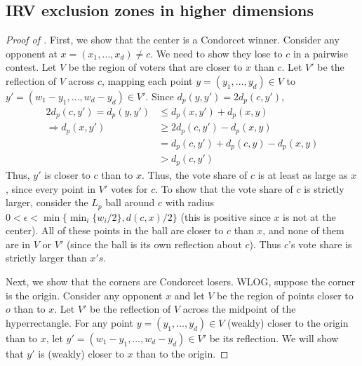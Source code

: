 \documentclass{article}
\theoremstyle{theorem}
\theoremstyle{definition}
\begin{document}
\subsection{IRV exclusion zones in higher dimensions}

\begin{proof}[Proof of ]
First, we show that the center is a Condorcet winner. Consider any opponent at $x = (x_1, \dots, x_d)\ne c$. We need to show they lose to $c$ in a pairwise contest. Let $V$ be the region of voters that are closer to $x$ than $c$. Let $V'$ be the reflection of $V$ across $c$, mapping each point $y = (y_1, \dots, y_d) \in V$ to $y' = (w_1-y_1, \dots, w_d-y_d) \in V'$. Since $d_p(y, y') = 2d_p(c, y')$,
  \begin{align*}
    2d_p(c, y') = d_p(y, y')&\le d_p(x, y') + d_p(x, y) \tag{triangle inequality}\\
    \Rightarrow d_p(x, y') &\ge 2d_p(c, y') - d_p(x, y) \\
        &= d_p(c, y') + d_p(c, y) - d_p(x, y)\tag{since $d_p(c, y) = d_p(c, y')$}\\
        &> d_p(c, y') \tag{since $d_p(c, y) > d_p(x, y)$ by def.\ of $V$}
  \end{align*}
  Thus, $y'$ is closer to $c$ than to $x$. Thus, the vote share of $c$ is at least as large as $x$, since every point in $V'$ votes for $c$. To show that the vote share of $c$ is strictly larger, consider the $L_p$ ball around $c$ with radius $0 < \epsilon < \min\{\min_i\{w_i/2\}, d(c, x)/2\}$ (this is positive since $x$ is not at the center). All of these points in the ball are closer to $c$ than $x$, and none of them are in $V$ or $V'$ (since the ball is its own reflection about $c$). Thus $c$'s vote share is strictly larger than $x's$.
  
  Next, we show that the corners are Condorcet losers. WLOG, suppose the corner is the origin. Consider any opponent $x$ and let $V$ be the region of points closer to $o$ than to $x$. Let $V'$ be the reflection of $V$ across the midpoint of the hyperrectangle. For any point $y = (y_1, \dots, y_d) \in V$ (weakly) closer to the origin than to $x$, let $y' = (w_1 - y_1, \dots, w_d - y_d) \in V'$ be its reflection. We will show that $y'$ is (weakly) closer to $x$ than to the origin.


\end{proof}
\end{document}
